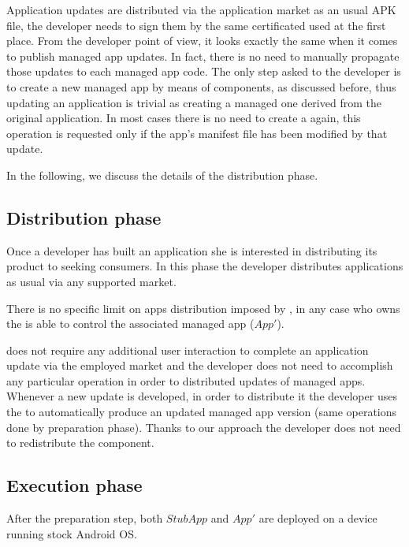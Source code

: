 Application updates are distributed via the application market as an usual APK file, the developer needs to sign them by the same certificated used at the first place. From the developer point of view, it looks exactly the same when it comes to publish managed app updates. In fact, there is no need to manually propagate those updates to each managed app code. The only step asked to the developer is to create a new managed app by means of \stubMaker components, as discussed before, thus updating an application is trivial as creating a managed one derived from the original application. In most cases there is no need to create a \stub again, this operation is requested only if the app's manifest file has been modified by that update.

In the following, we  discuss the details of the distribution phase.

\subsection{Distribution phase}
Once a developer has built an application she is interested in distributing its product to seeking consumers.  
In this phase the developer distributes applications as usual via any supported market.

There is no specific limit on apps distribution imposed by \asd, in any case who owns the \stub is able to control the associated managed app ($App'$).

\asd does not require any additional user interaction to complete an application update via the employed market and the developer does not need to accomplish any particular operation in order to distributed updates of managed apps. Whenever a new update is developed, in order to distribute it the developer uses the \stubMaker to automatically produce an updated managed app version (same operations done by preparation phase). Thanks to our approach the developer does not need to redistribute the \stub component. 

\subsection{Execution phase}
After the preparation step, both $StubApp$ and $App'$ are deployed on a device running stock Android OS.

